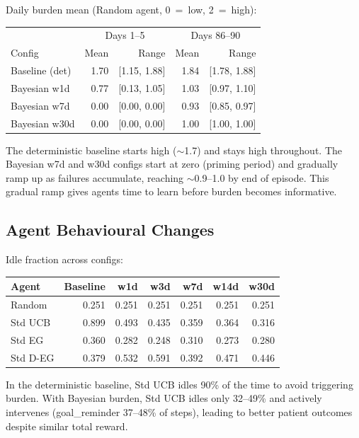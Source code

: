 \documentclass[11pt,a4paper]{article}
\begin{document}
Daily burden mean (Random agent, 0~=~low, 2~=~high):

\begin{center}
\begin{tabular}{l rr rr}
\toprule
 & \multicolumn{2}{c}{Days 1--5} & \multicolumn{2}{c}{Days 86--90} \\
Config & Mean & Range & Mean & Range \\
\midrule
Baseline (det) & 1.70 & [1.15, 1.88] & 1.84 & [1.78, 1.88] \\
Bayesian w1d   & 0.77 & [0.13, 1.05] & 1.03 & [0.97, 1.10] \\
Bayesian w7d   & 0.00 & [0.00, 0.00] & 0.93 & [0.85, 0.97] \\
Bayesian w30d  & 0.00 & [0.00, 0.00] & 1.00 & [1.00, 1.00] \\
\bottomrule
\end{tabular}
\end{center}

\noindent The deterministic baseline starts high ($\sim$1.7) and stays
high throughout.  The Bayesian w7d and w30d configs start at zero
(priming period) and gradually ramp up as failures accumulate, reaching
$\sim$0.9--1.0 by end of episode.  This gradual ramp gives agents time
to learn before burden becomes informative.

\subsection{Agent Behavioural Changes}

Idle fraction across configs:

\begin{center}
\begin{tabular}{l rrrrrr}
\toprule
Agent & Baseline & w1d & w3d & w7d & w14d & w30d \\
\midrule
Random     & 0.251 & 0.251 & 0.251 & 0.251 & 0.251 & 0.251 \\
Std UCB    & 0.899 & 0.493 & 0.435 & 0.359 & 0.364 & 0.316 \\
Std EG     & 0.360 & 0.282 & 0.248 & 0.310 & 0.273 & 0.280 \\
Std D-EG   & 0.379 & 0.532 & 0.591 & 0.392 & 0.471 & 0.446 \\
\bottomrule
\end{tabular}
\end{center}

\noindent In the deterministic baseline, Std UCB idles 90\% of the time
to avoid triggering burden.  With Bayesian burden, Std UCB idles only
32--49\% and actively intervenes (goal\_reminder 37--48\% of steps),
leading to better patient outcomes despite similar total reward.
\end{document}
